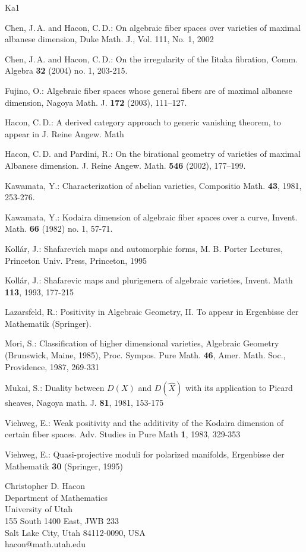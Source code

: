\documentclass[10pt, a4paper]{amsart}
\begin{document}
\begin{thebibliography}{Ka1}

{\sc Chen, J.\,A.} and {\sc Hacon, C.\,D.}:
On algebraic fiber spaces over varieties of maximal albanese dimension,
Duke Math. J., Vol. 111, No. 1, 2002

{\sc Chen, J.\,A.} and {\sc Hacon, C.\,D.}:
On the irregularity of the Iitaka fibration,
Comm. Algebra {\bf 32} (2004) no. 1, 203-215.

{\sc Fujino, O.}:
Algebraic fiber spaces whose general  fibers
are of maximal albanese dimension,
Nagoya Math. J.  {\bf 172}  (2003), 111--127.

{\sc Hacon, C.\,D.}:
A derived category approach to generic vanishing theorem,
to appear in J. Reine Angew. Math 

{\sc Hacon, C.\,D.} and {Pardini, R.}:
On the birational geometry of varieties of maximal Albanese dimension.  
J. Reine Angew. Math.  {\bf 546}  (2002), 177--199.

{\sc Kawamata, Y.}:
Characterization of abelian varieties,
Compositio Math. {\bf 43}, 1981, 253-276.

{\sc Kawamata, Y.}: Kodaira dimension of algebraic fiber spaces over a curve,
Invent. Math. {\bf 66} (1982) no. 1, 57-71.


{\sc Koll\'ar, J.}:
Shafarevich maps and automorphic forms,
M. B. Porter Lectures, Princeton Univ. Press, Princeton, 1995

{\sc Koll\'ar, J.}:
Shafarevic maps and plurigenera of algebraic varieties, Invent. Math {\bf 113},
1993, 177-215

{\sc Lazarsfeld, R.}:
Positivity in Algebraic Geometry, II. To appear in 
Ergenbisse der Mathematik (Springer).

{\sc Mori, S.}:
Classification of higher dimensional varieties, Algebraic Geometry 
(Brunswick, Maine, 1985), Proc. Sympos. Pure Math. {\bf 46},
Amer. Math. Soc., Providence, 1987, 269-331

{\sc Mukai, S.}:
Duality between $D(X)$ and $D(\hat {X})$
with its application to Picard sheaves,
Nagoya math. J. {\bf 81},
1981, 153-175

{\sc Viehweg, E.}:
Weak positivity and the additivity of the Kodaira dimension
of certain fiber spaces.
Adv. Studies in Pure Math {\bf 1}, 1983, 329-353

{\sc Viehweg, E.}:
Quasi-projective moduli for polarized manifolds,
Ergenbisse der Mathematik {\bf 30} (Springer, 1995)
\end{thebibliography}
\bigskip
\bigskip

\begin{minipage}{13cm}
\parbox[t]{12.5cm}{Christopher D. Hacon\\
Department of Mathematics\\
University of Utah\\
155 South 1400 East, JWB 233\\
Salt Lake City, Utah 84112-0090, USA\\
hacon@math.utah.edu}
\end{minipage}
\end{document}
